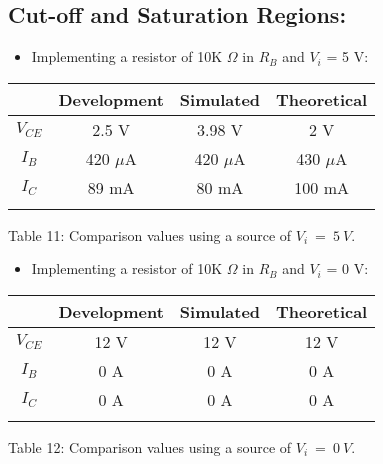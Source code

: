 \subsection{Cut-off and Saturation Regions:}
 
\hfill \hfill
{\bfseries
\begin{itemize}
\item Implementing a resistor of 10K $\Omega$ in $R_{B}$ and $V_{i}$ = 5 V:
\end{itemize}} \hfill 

\begin{center}
\begin{tabular}[1.5cm]{c c c c}
\toprule
\toprule
\centering \hspace{75pt} & \hspace{30pt} Development \hspace{30pt} & \hspace{30pt} Simulated \hspace{30pt} & \hspace{30pt} Theoretical \hspace{30pt} \\
\midrule
\midrule
$V_{CE}$ & 2.5 V & 3.98 V & 2 V \\
\cmidrule{1-4}
$I_{B}$ & 420 $\mu$A & 420 $\mu$A & 430 $\mu$A \\
\cmidrule{1-4}
$I_{C}$ & 89 mA & 80 mA & 100 mA \\
\bottomrule
\linebreak
\end{tabular}
\linebreak Table 11: Comparison values using a source of $V_{i}\ =\ 5\ V$.
\end{center} \hfill

{\bfseries
\begin{itemize}
\item Implementing a resistor of 10K $\Omega$ in $R_{B}$ and $V_{i}$ = 0 V:
\end{itemize}} \hfill 

\begin{center}
\begin{tabular}[1.5cm]{c c c c}
\toprule
\toprule
\centering \hspace{75pt} & \hspace{30pt} Development \hspace{30pt} & \hspace{30pt} Simulated \hspace{30pt} & \hspace{30pt} Theoretical \hspace{30pt} \\
\midrule
\midrule
$V_{CE}$ & 12 V & 12 V & 12 V \\
\cmidrule{1-4}
$I_{B}$ &  0 A & 0 A & 0 A \\
\cmidrule{1-4}
$I_{C}$ & 0 A & 0 A & 0 A \\
\bottomrule
\linebreak
\end{tabular}
\linebreak Table 12: Comparison values using a source of $V_{i}\ =\ 0\ V$.
\end{center} \hfill


